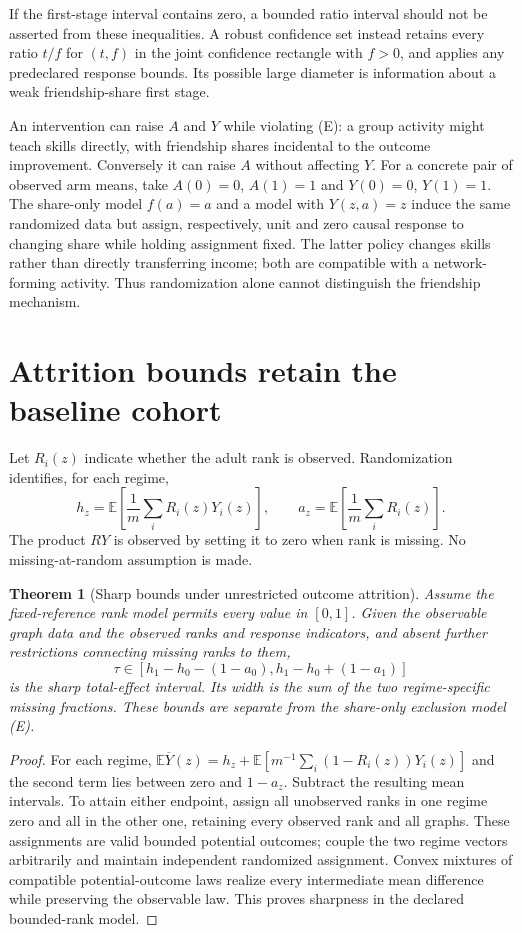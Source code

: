 \documentclass[11pt]{article}
\newtheorem{theorem}{Theorem}
\theoremstyle{remark}\newtheorem{remark}[theorem]{Remark}
\newcommand{\E}{\mathbb E}
\begin{document}
If the first-stage interval contains zero, a bounded ratio interval should not be asserted from these inequalities. A robust confidence set instead retains every ratio $t/f$ for $(t,f)$ in the joint confidence rectangle with $f>0$, and applies any predeclared response bounds. Its possible large diameter is information about a weak friendship-share first stage.

An intervention can raise $A$ and $Y$ while violating (E): a group activity might teach skills directly, with friendship shares incidental to the outcome improvement. Conversely it can raise $A$ without affecting $Y$. For a concrete pair of observed arm means, take $A(0)=0$, $A(1)=1$ and $Y(0)=0$, $Y(1)=1$. The share-only model $f(a)=a$ and a model with $Y(z,a)=z$ induce the same randomized data but assign, respectively, unit and zero causal response to changing share while holding assignment fixed. The latter policy changes skills rather than directly transferring income; both are compatible with a network-forming activity. Thus randomization alone cannot distinguish the friendship mechanism.

\section{Attrition bounds retain the baseline cohort}
Let $R_i(z)$ indicate whether the adult rank is observed. Randomization identifies, for each regime,
\[
 h_z=\E\left[\frac1m\sum_i R_i(z)Y_i(z)\right],\qquad
 a_z=\E\left[\frac1m\sum_i R_i(z)\right].
\]
The product $RY$ is observed by setting it to zero when rank is missing. No missing-at-random assumption is made.

\begin{theorem}[Sharp bounds under unrestricted outcome attrition]\label{attrition}
Assume the fixed-reference rank model permits every value in $[0,1]$. Given the observable graph data and the observed ranks and response indicators, and absent further restrictions connecting missing ranks to them,
\[
 \tau\in[h_1-h_0-(1-a_0),                     h_1-h_0+(1-a_1)]
\]
is the sharp total-effect interval. Its width is the sum of the two regime-specific missing fractions. These bounds are separate from the share-only exclusion model (E).
\end{theorem}
\begin{proof}
For each regime,
$\E\overline Y(z)=h_z+\E[m^{-1}\sum_i(1-R_i(z))Y_i(z)]$
and the second term lies between zero and $1-a_z$. Subtract the resulting mean intervals. To attain either endpoint, assign all unobserved ranks in one regime zero and all in the other one, retaining every observed rank and all graphs. These assignments are valid bounded potential outcomes; couple the two regime vectors arbitrarily and maintain independent randomized assignment. Convex mixtures of compatible potential-outcome laws realize every intermediate mean difference while preserving the observable law. This proves sharpness in the declared bounded-rank model.
\end{proof}
\end{document}
